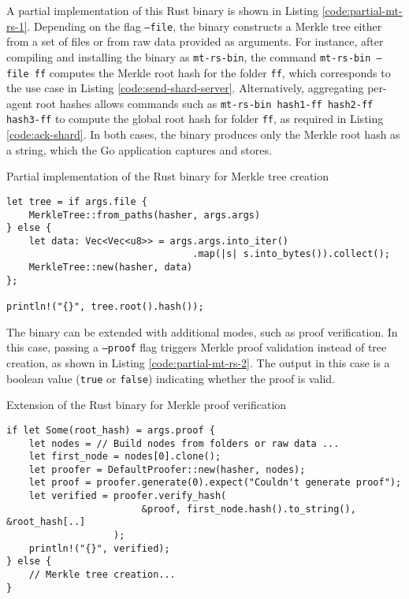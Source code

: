 A partial implementation of this Rust binary is shown in Listing
\ref{code:partial-mt-rs-1}. Depending on the flag \texttt{--file}, the binary constructs a 
Merkle tree either from a set of files or from raw data provided as arguments. For instance, 
after compiling and installing the binary as \texttt{mt-rs-bin}, the command 
\texttt{mt-rs-bin --file ff} computes the Merkle root hash for the folder \texttt{ff}, 
which corresponds to the use case in Listing \ref{code:send-shard-server}. Alternatively, 
aggregating per-agent root hashes allows commands such as 
\texttt{mt-rs-bin hash1-ff hash2-ff hash3-ff} to compute the global root hash for folder 
\texttt{ff}, as required in Listing \ref{code:ack-shard}. In both cases, the binary 
produces only the Merkle root hash as a string, which the Go application captures and stores.  

\begin{listing}[H]
\caption{Partial implementation of the Rust binary for Merkle tree creation}
\label{code:partial-mt-rs-1}
\begin{verbatim}
let tree = if args.file {
    MerkleTree::from_paths(hasher, args.args)
} else {
    let data: Vec<Vec<u8>> = args.args.into_iter()
                                 .map(|s| s.into_bytes()).collect();
    MerkleTree::new(hasher, data)
};

println!("{}", tree.root().hash());
\end{verbatim}
\end{listing}

The binary can be extended with additional modes, such as proof verification. 
In this case, passing a \texttt{--proof} flag triggers Merkle proof validation instead of 
tree creation, as shown in Listing \ref{code:partial-mt-rs-2}. The output in this case is 
a boolean value (\texttt{true} or \texttt{false}) indicating whether the proof is valid.  

\begin{listing}[H]
\caption{Extension of the Rust binary for Merkle proof verification}
\label{code:partial-mt-rs-2}
\begin{verbatim}
if let Some(root_hash) = args.proof {
    let nodes = // Build nodes from folders or raw data ...
    let first_node = nodes[0].clone();
    let proofer = DefaultProofer::new(hasher, nodes);
    let proof = proofer.generate(0).expect("Couldn't generate proof");
    let verified = proofer.verify_hash(
                        &proof, first_node.hash().to_string(), &root_hash[..]
                   );
    println!("{}", verified);
} else {
    // Merkle tree creation...
}
\end{verbatim}
\end{listing}

